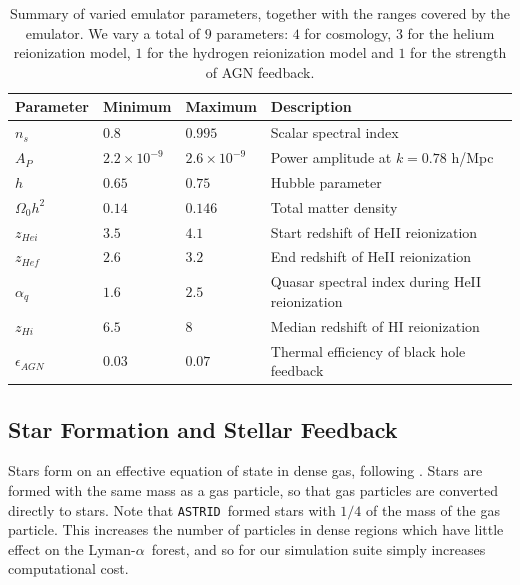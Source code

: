 \documentclass[a4paper,11pt]{article}
\newcommand{\Lya}{Lyman-$\alpha$}
\newcommand{\astrid}{\texttt{ASTRID}}
\begin{document}

\begin{table}
\begin{centering}
  \begin{tabular}{llll}
  \hline
  Parameter & Minimum & Maximum & Description \\
    \hline
    $n_s$  &  $0.8$  & $0.995$ & Scalar spectral index \\
    $A_P$  &  $2.2 \times 10^{-9}$  & $2.6 \times 10^{-9}$ & Power amplitude at $k = 0.78$ h/Mpc \\
    $h$    & $0.65$  & $0.75$ & Hubble parameter \\
    $\Omega_0 h^2$ & $0.14$ & $0.146$ & Total matter density \\
    $z_{Hei}$      & $3.5$  & $4.1$  & Start redshift of HeII reionization \\
    $z_{Hef}$      & $2.6$  & $3.2$  & End redshift of HeII reionization \\
    $\alpha_q$     & $1.6$  & $2.5$ & Quasar spectral index during HeII reionization  \\
    $z_{Hi}$        & $6.5$ & $8$   & Median redshift of HI reionization \\
    $\epsilon_{AGN}$ & $0.03$ & $0.07$ & Thermal efficiency of black hole feedback \\
    \hline
  \end{tabular}
  \caption{Summary of varied emulator parameters, together with the ranges covered by the emulator. We vary a total of $9$ parameters: $4$ for cosmology, $3$ for the helium reionization model, $1$ for the hydrogen reionization model and $1$ for the strength of AGN feedback.}
  \label{tab:emulatorparams}
  \end{centering}
\end{table}

\subsection{Star Formation and Stellar Feedback}
\label{sec:stellar}

Stars form on an effective equation of state in dense gas, following \cite{Springel:2003}. Stars are formed with the same mass as a gas particle, so that gas particles are converted directly to stars. Note that \astrid~formed stars with $1/4$ of the mass of the gas particle. This increases the number of particles in dense regions which have little effect on the \Lya~forest, and so for our simulation suite simply increases computational cost.
\end{document}
